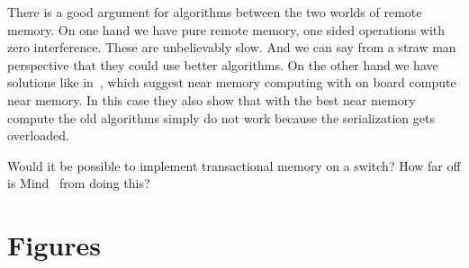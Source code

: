There is a good argument for algorithms between the two worlds of remote memory.
On one hand we have pure remote memory, one sided operations with zero
interference. These are unbelievably slow. And we can say from a straw man
perspective that they could use better algorithms. On the other hand we have
solutions like in~\cite{design-far-memory-struct,near-memory-structs}, which
suggest near memory computing with on board compute near memory. In this case
they also show that with the best near memory compute the old algorithms simply
do not work because the serialization gets overloaded.

Would it be possible to implement transactional memory on a switch? How far off
is Mind~\cite{mind} from doing this?

\section{Figures}





